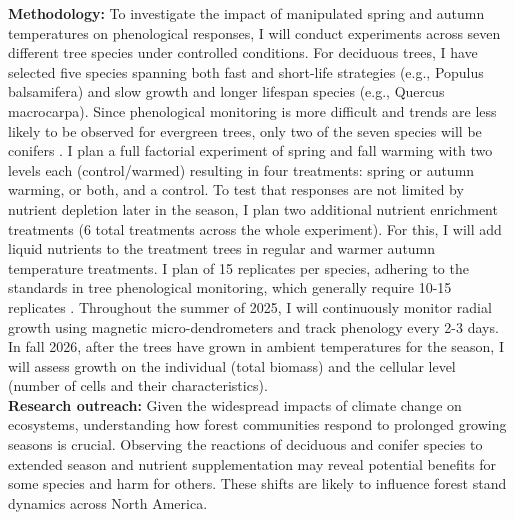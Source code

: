 \documentclass{article}
\begin{document}
\textbf {Methodology:} To investigate the impact of manipulated spring and autumn temperatures on phenological responses, I will conduct experiments across seven different tree species under controlled conditions. For deciduous trees, I have selected five species spanning both fast and short-life strategies (e.g., Populus balsamifera) and slow growth and longer lifespan species (e.g., Quercus macrocarpa). Since phenological monitoring is more difficult and trends are less likely to be observed for evergreen trees, only two of the seven species will be conifers \citep{jonsson_annual_2010}. I plan a full factorial experiment of spring and fall warming with two levels each (control/warmed) resulting in four treatments: spring or autumn warming, or both, and a control. To test that responses are not limited by nutrient depletion later in the season, I plan two additional nutrient enrichment treatments (6 total treatments across the whole experiment). For this, I will add liquid nutrients to the treatment trees in regular and warmer autumn temperature treatments. I plan of 15 replicates per species, adhering to the standards in tree phenological monitoring, which generally require 10-15 replicates \citep{siegel_collaborative_2009}.
Throughout the summer of 2025, I will continuously monitor radial growth using magnetic micro-dendrometers and track phenology every 2-3 days. In fall 2026, after the trees have grown in ambient temperatures for the season, I will assess growth on the individual (total biomass) and the cellular level (number of cells and their characteristics). \\
\textbf{Research outreach:} Given the widespread impacts of climate change on ecosystems, understanding how forest communities respond to prolonged growing seasons is crucial. Observing the reactions of deciduous and conifer species to extended season and nutrient supplementation may reveal potential benefits for some species and harm for others. These shifts are likely to influence forest stand dynamics across North America.


\end{document}
